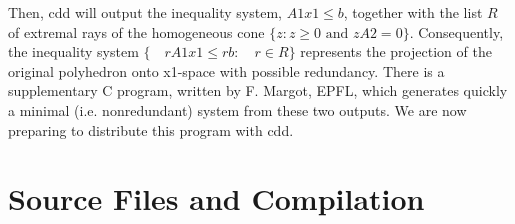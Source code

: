 \begin{description}
Then, cdd will output the inequality system,  $A1 x1  \le b$, together with the list $R$ of extremal
rays of the homogeneous cone  $\{z:  z  \ge 0  \mbox{ and }  z A2 = 0 \}$.  
Consequently, the inequality system
$\{ \quad r A1  x1  \le  r b : \quad r \in  R \}$
represents the projection of the original polyhedron onto
x1-space with possible redundancy.   There is a supplementary  C program, 
written by F. Margot, EPFL, which generates quickly a minimal
(i.e. nonredundant) system from these two outputs.
We are now preparing to distribute this program with cdd.
\end{description}

\section{Source Files and Compilation}  \label{CAUTIONS}

